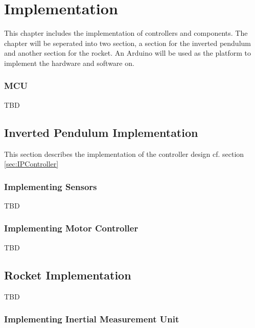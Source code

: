 \chapter{Implementation}
This chapter includes the implementation of controllers and components. The chapter will be seperated into two section, a section for the inverted pendulum and another section for the rocket. An Arduino will be used as the platform to implement the hardware and software on.    


\subsection{MCU}\label{sec:MCU}
TBD


\section{Inverted Pendulum Implementation}
This section describes the implementation of the controller design cf. section \ref{sec:IPController}

\subsection{Implementing Sensors}
TBD



\subsection{Implementing Motor Controller}
TBD


\section{Rocket Implementation}
TBD

\subsection{Implementing Inertial Measurement Unit}